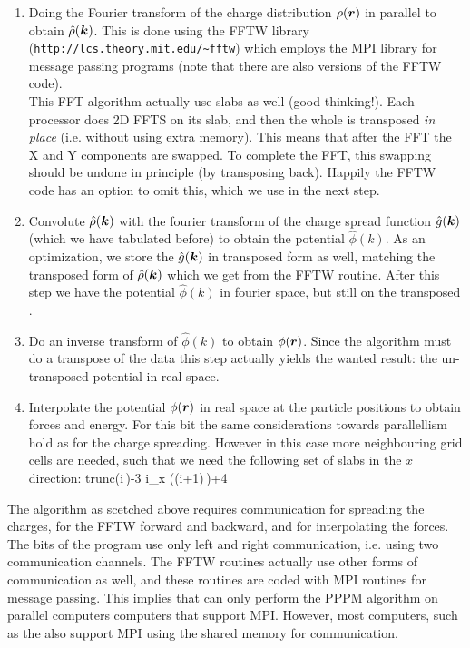 \begin{enumerate}
\item	Doing the Fourier transform of the charge distribution $\rho(\mbox{\boldmath ${r}$})$ 
	in parallel to obtain $\hat{\rho}(\mbox{\boldmath ${k}$})$. This is done using the
	FFTW library ({\tt http://lcs.theory.mit.edu/\~{ }fftw}) 
	which employs the MPI library for message passing 
	programs (note that there are also  versions of the
	FFTW code).\\
	This FFT algorithm actually use slabs as well (good thinking!).
	Each processor does 2D FFTS on its slab, and then the whole {\fftgrid}
	is transposed {\em in place} (i.e. without using extra memory).
	This means that after the FFT the X and Y components are swapped.
	To complete the FFT, this swapping should be undone in principle
	(by transposing back).
	Happily the FFTW code has an option to omit this,
	which we use in the next step.
\item	Convolute $\hat{\rho}(\mbox{\boldmath ${k}$})$ with the fourier transform of the
	charge spread function $\hat{g}(\mbox{\boldmath ${k}$})$ (which we have tabulated before)
	to obtain the potential $\hat{\phi}(k)$. 
	As an optimization, we store the $\hat{g}(\mbox{\boldmath ${k}$})$  in transposed form
	as well, matching the transposed form of $\hat{\rho}(\mbox{\boldmath ${k}$})$
	which we get from the FFTW routine. After this step we have the 
	potential $\hat{\phi}(k)$ in fourier space, but still on the transposed
	{\fftgrid}.
\item	Do an inverse transform of $\hat{\phi}(k)$ to obtain
	${\phi}(\mbox{\boldmath ${r}$})$. Since the algorithm must do a transpose of the data
	this step actually yields the wanted result: the un-transposed
	potential in real space.
\item	Interpolate the potential ${\phi}(\mbox{\boldmath ${r}$})$ in real space at the particle
	positions to obtain forces and energy. For this bit the same considerations
	towards parallellism hold as for the charge spreading. However in this
	case more neighbouring grid cells are needed, such that we need
	the following set of {\fftgrid} slabs in the $x$ direction:
	\beq
	{\rm trunc}\left(i\,\right)-3 \le i_x \left((i+1)\,\right)+4
	\eeq

\end{enumerate}
The algorithm as scetched above requires communication for spreading the charges,
for the FFTW forward and backward, and for interpolating the forces.
The {\gromacs} bits of the program use only left and right communication, i.e.
using two communication channels. The FFTW routines actually use other forms
of communication as well, and these routines are coded with MPI routines for
message passing. This implies that {\gromacs} can only perform the PPPM algorithm
on parallel computers computers that support MPI. However, 
most 
computers, such as the  
also support MPI using the shared memory for communication.


